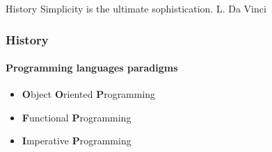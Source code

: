 \begin{sepframe}{History}
    {\scriptsize{Simplicity is the ultimate sophistication. L. Da Vinci}}
\end{sepframe}

\begin{frame}[fragile,c]
\end{frame}

\begin{frame}
    \frametitle{History}
    \framesubtitle{Programming languages paradigms}

    \begin{itemize}[<+->]
        \item \textbf{O}bject \textbf{O}riented \textbf{P}rogramming
        \item \textbf{F}unctional \textbf{P}rogramming
        \item \textbf{I}mperative \textbf{P}rogramming
    \end{itemize}
\end{frame}

